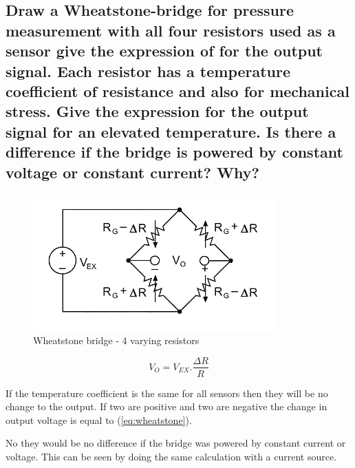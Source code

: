 \documentclass[10pt,a4paper]{article}
\begin{document}
\subsection{Draw a Wheatstone-bridge for pressure measurement with all four resistors used as a sensor give the expression of for the output signal. Each resistor has a temperature coefficient of resistance and also for mechanical stress. Give the expression for the output signal for an elevated temperature. Is there a difference if the bridge is powered by constant voltage or constant current? Why?}

\begin{figure}[h!]
    \centering
    \includegraphics{bridge.png}
    \caption{Wheatstone bridge - 4 varying resistors}
\end{figure}

\begin{equation} \label{eq:wheatstone}
	V_{O} = V_{EX}.\frac{\Delta R}{R}
\end{equation}

If the temperature coefficient is the same for all sensors then they will be no change to the output. If two are positive and two are negative the change in output voltage is equal to (\ref{eq:wheatstone}).

No they would be no difference if the bridge was powered by constant current or voltage. This can be seen by doing the same calculation with a current source.

\end{document}
